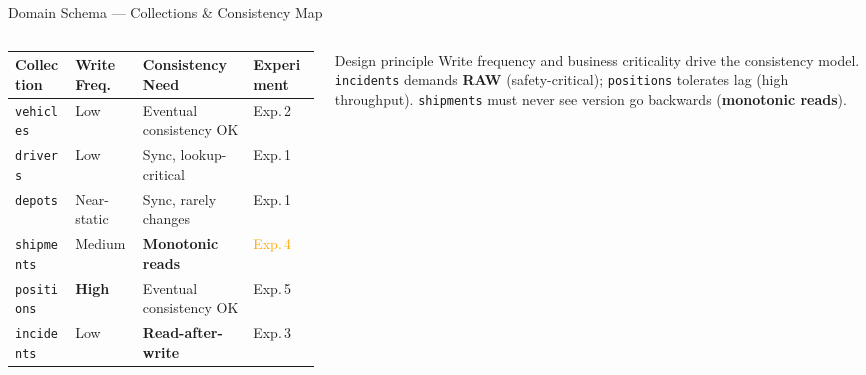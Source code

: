 \documentclass[aspectratio=169]{beamer}
\begin{document}
\begin{frame}[fragile]{Domain Schema --- Collections \& Consistency Map}
  \begin{columns}[T]
      \vspace{0.1cm}
      \begin{table}
        \scriptsize
        \setlength{\tabcolsep}{4pt}
        \begin{tabular}{p{}p{}p{}p{}}
          \toprule
          \textbf{Collection} & \textbf{Write Freq.} & \textbf{Consistency Need} & \textbf{Experiment} \\
          \midrule
          \texttt{vehicles}
            & Low
            & Eventual consistency OK
            & \textcolor{secondary}{Exp.\,2} \\
          \addlinespace[2pt]
          \texttt{drivers}
            & Low
            & Sync, lookup-critical
            & \textcolor{secondary}{Exp.\,1} \\
          \addlinespace[2pt]
          \texttt{depots}
            & Near-static
            & Sync, rarely changes
            & \textcolor{secondary}{Exp.\,1} \\
          \addlinespace[2pt]
          \texttt{shipments}
            & Medium
            & \textbf{Monotonic reads}
            & \textcolor{orange}{Exp.\,4} \\
          \addlinespace[2pt]
          \texttt{positions}
            & \textbf{High}
            & Eventual consistency OK
            & \textcolor{secondary}{Exp.\,5} \\
          \addlinespace[2pt]
          \texttt{incidents}
            & Low
            & \textcolor{danger}{\textbf{Read-after-write}}
            & \textcolor{danger}{Exp.\,3} \\
          \bottomrule
        \end{tabular}
      \end{table}
      \vspace{0.15cm}
      \begin{block}{Design principle}
        \scriptsize Write frequency and business criticality drive the consistency model. \texttt{incidents} demands \textbf{RAW} (safety-critical); \texttt{positions} tolerates lag (high throughput). \texttt{shipments} must never see version go backwards (\textbf{monotonic reads}).
      \end{block}


\end{columns}
\end{frame}
\end{document}
